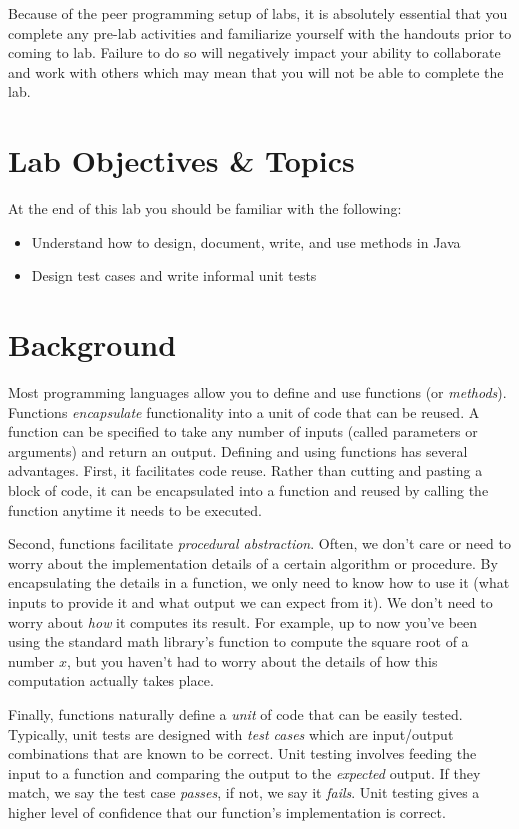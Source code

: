 \documentclass[12pt]{scrartcl}
\begin{document}
Because of the peer programming setup of labs, it is absolutely 
essential that you complete any pre-lab activities and familiarize
yourself with the handouts prior to coming to lab.  Failure to do
so will negatively impact your ability to collaborate and work with 
others which may mean that you will not be able to complete the
lab.  

\section{Lab Objectives \& Topics}
At the end of this lab you should be familiar with the following:
\begin{itemize}
  \item Understand how to design, document, write, and use methods in Java
  \item Design test cases and write informal unit tests
\end{itemize}

\section{Background}

Most programming languages allow you to define and use functions 
(or \emph{methods}).  Functions \emph{encapsulate} functionality into a 
unit of code that can be reused.  A function can be specified to 
take any number of inputs (called parameters or arguments) and 
return an output.  Defining and using functions has several advantages.  
First, it facilitates code reuse.  Rather than 
cutting and pasting a block of code, it can be encapsulated 
into a function and reused by calling the function anytime it needs 
to be executed.

Second, functions facilitate \emph{procedural abstraction}.  Often, 
we don't care or need to worry about the implementation 
details of a certain algorithm or procedure.  By encapsulating the 
details in a function, we only need to know how to use it (what 
inputs to provide it and what output we can expect from it).  We
don't need to worry about \emph{how} it computes its result.  For example,
up to now you've been using the standard math library's function
to compute the square root of a number $x$, but you haven't
had to worry about the details of how this computation actually
takes place.

Finally, functions naturally define a \emph{unit} of code that can
be easily tested.  Typically, unit tests are designed with 
\emph{test cases} which are input/output combinations that are
known to be correct.  Unit testing involves feeding the input to
a function and comparing the output to the \emph{expected} output.
If they match, we say the test case \emph{passes}, if not, we say
it \emph{fails}.  Unit testing gives a higher level of confidence
that our function's implementation is correct.
\end{document}
